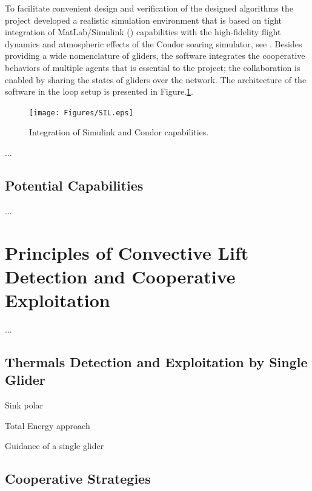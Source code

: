 \documentclass[letterpaper, 10 pt, conference]{ieeeconf}  %
\begin{document}
To facilitate convenient design and verification of the designed algorithms 
the project developed a realistic simulation environment that is based on 
tight integration of MatLab/Simulink (\cite{MATLAB:2013}) capabilities with 
the high-fidelity flight dynamics and atmospheric effects of the Condor 
soaring simulator, see \cite{Condor:2013:Online}. Besides providing a wide 
nomenclature of gliders, the software integrates the cooperative behaviors of 
multiple agents that is essential to the project; the collaboration is 
enabled by sharing the states of gliders over the network. The architecture 
of the software in the loop setup is presented in Figure.\ref{fig:SIL}.
%

\begin{figure}[thpb]
  \centering
  \texttt{[image: Figures/SIL.eps]}
  \caption{Integration of Simulink and Condor capabilities.}
  \label{fig:SIL}
\end{figure}
...

\subsection{Potential Capabilities}

...

\section{Principles of Convective Lift Detection and Cooperative Exploitation}
...

\subsection{ Thermals Detection and Exploitation by Single Glider}

Sink polar

Total Energy approach

Guidance of a single glider

\subsection{ Cooperative Strategies}
\end{document}

